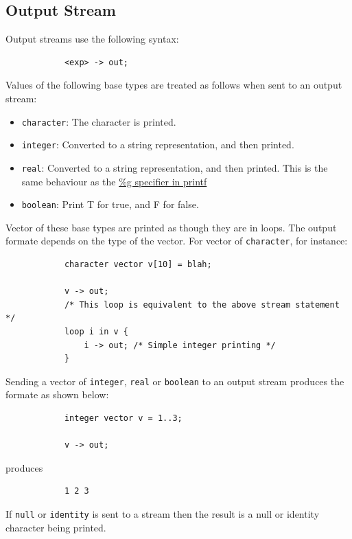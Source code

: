 \documentclass{article}
\begin{document}
	\subsection{Output Stream}
		Output streams use the following syntax:

		\begin{lstlisting}
			<exp> -> out;
		\end{lstlisting}

		Values of the following base types are treated as follows when sent to an output stream:

		\begin{itemize}
			\item \texttt{character}: The character is printed.
			\item \texttt{integer}: Converted to a string representation, and then printed.
			\item \texttt{real}: Converted to a string representation, and then printed.  This is the same behaviour as
			the \href{http://www.cplusplus.com/reference/cstdio/printf/	}{\%g specifier in printf}

			\item \texttt{boolean}: Print T for true, and F for false.
		\end{itemize}

		Vector of these base types are printed as though they are in loops. The output formate depends on the type of
		the vector.  For vector of \texttt{character}, for instance:

		\begin{lstlisting}
			character vector v[10] = blah;

			v -> out;
			/* This loop is equivalent to the above stream statement */
			loop i in v {
			    i -> out; /* Simple integer printing */
			}
		\end{lstlisting}

		Sending a vector of \texttt{integer}, \texttt{real} or \texttt{boolean} to an output stream produces the formate
		as shown below:

		\begin{lstlisting}
			integer vector v = 1..3;

			v -> out;
		\end{lstlisting}

		produces

		\begin{lstlisting}
			1 2 3
		\end{lstlisting}

		If \texttt{null} or \texttt{identity} is sent to a stream then the result is a null or identity character being
		printed.
\end{document}
